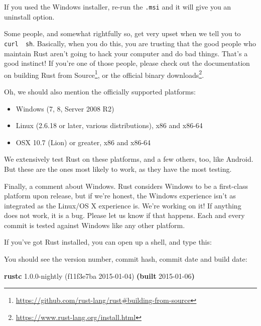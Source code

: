 \documentclass[a4paper,]{book}
\newenvironment{Shaded}{\begin{snugshade}}{\end{snugshade}}
\newcommand{\KeywordTok}[1]{\textcolor[rgb]{0.13,0.29,0.53}{\textbf{{#1}}}}
\newcommand{\NormalTok}[1]{{#1}}
\renewcommand{\href}[2]{#2\footnote{\url{#1}}}
\begin{document}
If you used the Windows installer, re-run the \texttt{.msi} and it will
give you an uninstall option.

Some people, and somewhat rightfully so, get very upset when we tell you
to \texttt{curl\ \textbar{}\ sh}. Basically, when you do this, you are
trusting that the good people who maintain Rust aren't going to hack
your computer and do bad things. That's a good instinct! If you're one
of those people, please check out the documentation on
\href{https://github.com/rust-lang/rust\#building-from-source}{building
Rust from Source}, or \href{https://www.rust-lang.org/install.html}{the
official binary downloads}.

Oh, we should also mention the officially supported platforms:

\begin{itemize}
\itemsep1pt\parskip0pt
\item
  Windows (7, 8, Server 2008 R2)
\item
  Linux (2.6.18 or later, various distributions), x86 and x86-64
\item
  OSX 10.7 (Lion) or greater, x86 and x86-64
\end{itemize}

We extensively test Rust on these platforms, and a few others, too, like
Android. But these are the ones most likely to work, as they have the
most testing.

Finally, a comment about Windows. Rust considers Windows to be a
first-class platform upon release, but if we're honest, the Windows
experience isn't as integrated as the Linux/OS X experience is. We're
working on it! If anything does not work, it is a bug. Please let us
know if that happens. Each and every commit is tested against Windows
like any other platform.

If you've got Rust installed, you can open up a shell, and type this:

\begin{Shaded}
\end{Shaded}

You should see the version number, commit hash, commit date and build
date:

\begin{Shaded}
\begin{Highlighting}[]
\KeywordTok{rustc} \NormalTok{1.0.0-nightly (f11f3e7ba 2015-01-04) }\KeywordTok{(built} \NormalTok{2015-01-06}\KeywordTok{)}
\end{Highlighting}
\end{Shaded}
\end{document}

